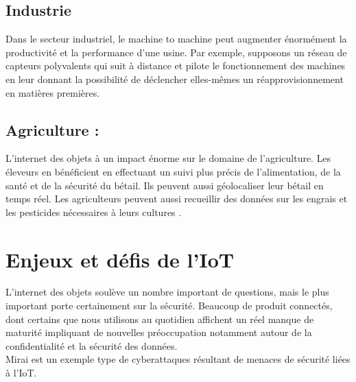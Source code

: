 		\subsection*{Industrie }
		Dans le secteur industriel, le machine to machine peut augmenter énormément la productivité et la performance d’une usine. Par exemple, supposons un réseau de capteurs polyvalents qui suit à distance et pilote le fonctionnement des machines en leur donnant la possibilité de déclencher elles-mêmes un réapprovisionnement en matières premières.
		
		\subsection*{Agriculture :}
		L’internet des objets à un impact énorme sur le domaine de l’agriculture. Les éleveurs en bénéf{\kern0pt}icient en ef{\kern0pt}fectuant un suivi plus précis de l’alimentation, de la santé et de la sécurité du bétail. Ils peuvent aussi géolocaliser leur bétail en temps réel. Les agriculteurs peuvent aussi recueillir des données sur les engrais et les pesticides nécessaires à leurs cultures \cite{krigman2018agriculture}.
	
	\section{Enjeux et déf{\kern0pt}is de l’IoT}
	L’internet des objets soulève un nombre important de questions, mais le plus important porte certainement sur la sécurité. Beaucoup de produit connectés, dont certains que nous utilisons au quotidien af{\kern0pt}f{\kern0pt}ichent un réel manque de maturité impliquant de nouvelles préoccupation notamment autour de la conf{\kern0pt}identialité et la sécurité des données.\\
Mirai est un exemple type de cyberattaques résultant de menaces de sécurité liées à l’IoT.

